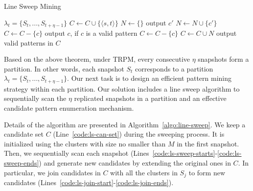 \begin{algorithm}[h]
\small
\caption{Line Sweep Mining}
\label{algo:line-sweep}
\begin{algorithmic}[1]
\Require $\lambda_t = \{S_t, ..., S_{t+\eta-1}\}$
  \label{code:ls-can-set}
\label{code:ls-init-start}
\State $C\leftarrow C\cup \{\langle s, t \rangle \}$
\EndIf
\EndFor
\label{code:ls-init-end}
 \label{code:ls-sweep-starts}
	\State $N \gets \{\}$
	 \label{code:ls-join-start}
		 \label{code:ls-join}
			\State output $c'$
			\State $N\leftarrow N\cup \{c'\}$ \label{code:ls-m-prun}	
		\EndIf
	\EndFor \label{code:ls-join-ends}
		\label{code:ls-g-prune-starts}
			\State $C\leftarrow C-\{c\}$ 
			\State output $c$, if $c$ is a valid pattern
		\EndIf  \label{code:ls-g-prune-ends}
		\label{code:ls-l-prune-starts}
			\State $C\leftarrow C-\{c\}$ 
		\EndIf\label{code:ls-l-prune-ends}
	\EndFor
	\State $C\leftarrow C\cup N$
\EndFor\label{code:ls-sweep-ends}
\State output valid patterns in  $C$  \label{code:ls-valid-check}
\end{algorithmic}
\end{algorithm}



Based on the above theorem, under TRPM, every consecutive $\eta$ snapshots
form a partition. In other words, each snapshot $S_t$ corresponds to a partition $\lambda_t=\{S_t,...,S_{t+\eta-1}\}$. Our next task is to design an efficient pattern mining strategy within each partition. Our solution includes a line sweep algorithm to sequentially scan the $\eta$ replicated snapshots in a partition and an effective candidate pattern enumeration mechanism.  

Details of the algorithm are presented in Algorithm~\ref{algo:line-sweep}. We keep a candidate set $C$ (Line~\ref{code:ls-can-set}) during the sweeping process. It is initialized using the clusters with size no smaller than $M$ in the first snapshot. Then, we sequentially scan each snapshot (Lines~\ref{code:ls-sweep-starts}-\ref{code:ls-sweep-ends}) and generate new candidates by extending the original ones in $C$.
In particular, we join candidates in $C$ with all the clusters in $S_j$ to form new candidates (Lines~\ref{code:ls-join-start}-\ref{code:ls-join-ends}). 

